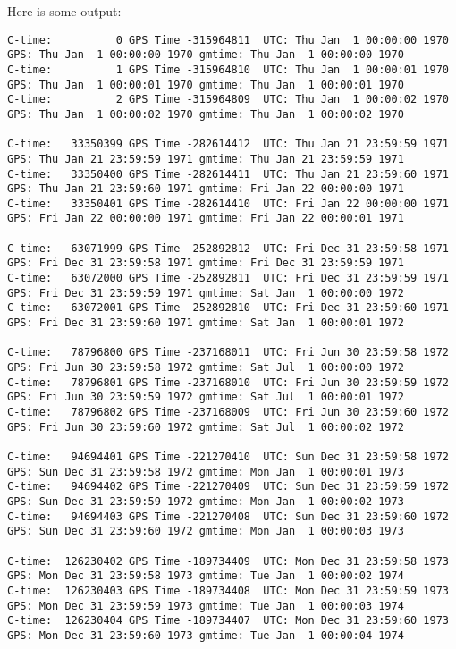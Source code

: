 Here is some output:
{\tiny
\begin{verbatim}
C-time:          0 GPS Time -315964811  UTC: Thu Jan  1 00:00:00 1970 GPS: Thu Jan  1 00:00:00 1970 gmtime: Thu Jan  1 00:00:00 1970
C-time:          1 GPS Time -315964810  UTC: Thu Jan  1 00:00:01 1970 GPS: Thu Jan  1 00:00:01 1970 gmtime: Thu Jan  1 00:00:01 1970
C-time:          2 GPS Time -315964809  UTC: Thu Jan  1 00:00:02 1970 GPS: Thu Jan  1 00:00:02 1970 gmtime: Thu Jan  1 00:00:02 1970

C-time:   33350399 GPS Time -282614412  UTC: Thu Jan 21 23:59:59 1971 GPS: Thu Jan 21 23:59:59 1971 gmtime: Thu Jan 21 23:59:59 1971
C-time:   33350400 GPS Time -282614411  UTC: Thu Jan 21 23:59:60 1971 GPS: Thu Jan 21 23:59:60 1971 gmtime: Fri Jan 22 00:00:00 1971
C-time:   33350401 GPS Time -282614410  UTC: Fri Jan 22 00:00:00 1971 GPS: Fri Jan 22 00:00:00 1971 gmtime: Fri Jan 22 00:00:01 1971

C-time:   63071999 GPS Time -252892812  UTC: Fri Dec 31 23:59:58 1971 GPS: Fri Dec 31 23:59:58 1971 gmtime: Fri Dec 31 23:59:59 1971
C-time:   63072000 GPS Time -252892811  UTC: Fri Dec 31 23:59:59 1971 GPS: Fri Dec 31 23:59:59 1971 gmtime: Sat Jan  1 00:00:00 1972
C-time:   63072001 GPS Time -252892810  UTC: Fri Dec 31 23:59:60 1971 GPS: Fri Dec 31 23:59:60 1971 gmtime: Sat Jan  1 00:00:01 1972

C-time:   78796800 GPS Time -237168011  UTC: Fri Jun 30 23:59:58 1972 GPS: Fri Jun 30 23:59:58 1972 gmtime: Sat Jul  1 00:00:00 1972
C-time:   78796801 GPS Time -237168010  UTC: Fri Jun 30 23:59:59 1972 GPS: Fri Jun 30 23:59:59 1972 gmtime: Sat Jul  1 00:00:01 1972
C-time:   78796802 GPS Time -237168009  UTC: Fri Jun 30 23:59:60 1972 GPS: Fri Jun 30 23:59:60 1972 gmtime: Sat Jul  1 00:00:02 1972

C-time:   94694401 GPS Time -221270410  UTC: Sun Dec 31 23:59:58 1972 GPS: Sun Dec 31 23:59:58 1972 gmtime: Mon Jan  1 00:00:01 1973
C-time:   94694402 GPS Time -221270409  UTC: Sun Dec 31 23:59:59 1972 GPS: Sun Dec 31 23:59:59 1972 gmtime: Mon Jan  1 00:00:02 1973
C-time:   94694403 GPS Time -221270408  UTC: Sun Dec 31 23:59:60 1972 GPS: Sun Dec 31 23:59:60 1972 gmtime: Mon Jan  1 00:00:03 1973

C-time:  126230402 GPS Time -189734409  UTC: Mon Dec 31 23:59:58 1973 GPS: Mon Dec 31 23:59:58 1973 gmtime: Tue Jan  1 00:00:02 1974
C-time:  126230403 GPS Time -189734408  UTC: Mon Dec 31 23:59:59 1973 GPS: Mon Dec 31 23:59:59 1973 gmtime: Tue Jan  1 00:00:03 1974
C-time:  126230404 GPS Time -189734407  UTC: Mon Dec 31 23:59:60 1973 GPS: Mon Dec 31 23:59:60 1973 gmtime: Tue Jan  1 00:00:04 1974


\end{verbatim}}
